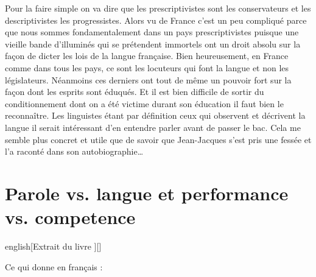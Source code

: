 Pour la faire simple on va dire que les prescriptivistes sont les
conservateurs et les descriptivistes les progressistes. Alors vu de
France c'est un peu compliqué parce que nous sommes fondamentalement
dans un pays prescriptivistes puisque une vieille bande d'illuminés
qui se prétendent immortels ont un droit absolu sur la façon de dicter
les lois de la langue française. Bien heureusement, en France comme
dans tous les pays, ce sont les locuteurs qui font la langue et non
les législateurs. Néanmoins ces derniers ont tout de même un pouvoir
fort sur la façon dont les esprits sont éduqués. Et il est bien
difficile de sortir du conditionnement dont on a été victime durant
son éducation il faut bien le reconnaître. Les linguistes étant par
définition ceux qui observent et décrivent la langue il serait
intéressant d'en entendre parler avant de passer le bac. Cela me
semble plus concret et utile que de savoir que Jean-Jacques s'est pris
une fessée et l'a raconté dans son autobiographie\dots{}

\section{Parole vs. langue et performance vs. competence}

\begin{foreigndisplayquote}{english}[Extrait du livre \bs][]
\end{foreigndisplayquote}

Ce qui donne en français :

\begin{quote}
\end{quote}


